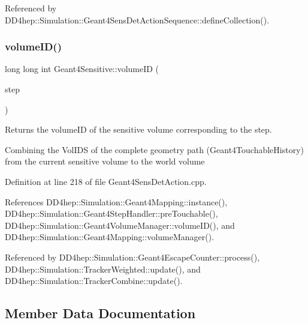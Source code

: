 Referenced by D\+D4hep\+::\+Simulation\+::\+Geant4\+Sens\+Det\+Action\+Sequence\+::define\+Collection().

\hypertarget{class_d_d4hep_1_1_simulation_1_1_geant4_sensitive_a9aa1270e3fb490a4ebe511343903d72f}{}\label{class_d_d4hep_1_1_simulation_1_1_geant4_sensitive_a9aa1270e3fb490a4ebe511343903d72f} 
\subsubsection{\texorpdfstring{volume\+I\+D()}{volumeID()}}
{\footnotesize\ttfamily long long int Geant4\+Sensitive\+::volume\+ID (\begin{DoxyParamCaption}\item[{const G4\+Step $\ast$}]{step }\end{DoxyParamCaption})}



Returns the volume\+ID of the sensitive volume corresponding to the step. 

Combining the Vol\+I\+DS of the complete geometry path (Geant4\+Touchable\+History) from the current sensitive volume to the world volume 

Definition at line 218 of file Geant4\+Sens\+Det\+Action.\+cpp.



References D\+D4hep\+::\+Simulation\+::\+Geant4\+Mapping\+::instance(), D\+D4hep\+::\+Simulation\+::\+Geant4\+Step\+Handler\+::pre\+Touchable(), D\+D4hep\+::\+Simulation\+::\+Geant4\+Volume\+Manager\+::volume\+I\+D(), and D\+D4hep\+::\+Simulation\+::\+Geant4\+Mapping\+::volume\+Manager().



Referenced by D\+D4hep\+::\+Simulation\+::\+Geant4\+Escape\+Counter\+::process(), D\+D4hep\+::\+Simulation\+::\+Tracker\+Weighted\+::update(), and D\+D4hep\+::\+Simulation\+::\+Tracker\+Combine\+::update().



\subsection{Member Data Documentation}
\hypertarget{class_d_d4hep_1_1_simulation_1_1_geant4_sensitive_a8b5b7e0dff9d8fcb154b646e1618821f}{}\label{class_d_d4hep_1_1_simulation_1_1_geant4_sensitive_a8b5b7e0dff9d8fcb154b646e1618821f} 
